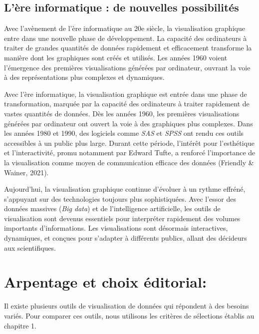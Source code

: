 \documentclass[
  letterpaper,
  DIV=11,
  numbers=noendperiod]{scrreprt}
\begin{document}
\hypertarget{luxe8re-informatique-de-nouvelles-possibilituxe9s}{%
\subsection{L'ère informatique : de nouvelles
possibilités}\label{luxe8re-informatique-de-nouvelles-possibilituxe9s}}

Avec l'avènement de l'ère informatique au 20e siècle, la visualisation
graphique entre dans une nouvelle phase de développement. La capacité
des ordinateurs à traiter de grandes quantités de données rapidement et
efficacement transforme la manière dont les graphiques sont créés et
utilisés. Les années 1960 voient l'émergence des premières
visualisations générées par ordinateur, ouvrant la voie à des
représentations plus complexes et dynamiques.

Avec l'ère informatique, la visualisation graphique est entrée dans une
phase de transformation, marquée par la capacité des ordinateurs à
traiter rapidement de vastes quantités de données. Dès les années 1960,
les premières visualisations générées par ordinateur ont ouvert la voie
à des graphiques plus complexes. Dans les années 1980 et 1990, des
logiciels comme \emph{SAS} et \emph{SPSS} ont rendu ces outils
accessibles à un public plus large. Durant cette période, l'intérêt pour
l'esthétique et l'interactivité, promu notamment par Edward Tufte, a
renforcé l'importance de la visualisation comme moyen de communication
efficace des données (Friendly \& Wainer, 2021).

Aujourd'hui, la visualisation graphique continue d'évoluer à un rythme
effréné, s'appuyant sur des technologies toujours plus sophistiquées.
Avec l'essor des données massives (\emph{Big data}) et de l'intelligence
artificielle, les outils de visualisation sont devenus essentiels pour
interpréter rapidement des volumes importants d'informations. Les
visualisations sont désormais interactives, dynamiques, et conçues pour
s'adapter à différents publics, allant des décideurs aux scientifiques.

\hypertarget{arpentage-et-choix-uxe9ditorial}{%
\section{Arpentage et choix
éditorial:}\label{arpentage-et-choix-uxe9ditorial}}

Il existe plusieurs outils de visualisation de données qui répondent à
des besoins variés. Pour comparer ces outils, nous utilisons les
critères de sélections établis au chapitre 1.
\end{document}
